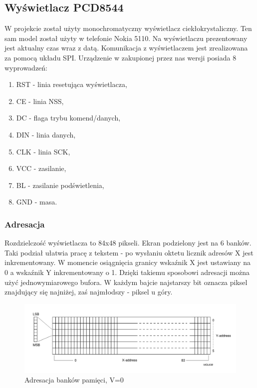 \documentclass{article}
\begin{document}
\subsection{Wyświetlacz PCD8544}

W projekcie został użyty monochromatyczny wyświetlacz ciekłokrystaliczny. Ten sam model
został użyty w telefonie Nokia 5110. Na wyświetlaczu prezentowany jest aktualny czas wraz z datą.
Komunikacja z wyświetlaczem jest zrealizowana za pomocą układu SPI.
Urządzenie w zakupionej przez nas wersji posiada 8 wyprowadzeń:

\begin{enumerate}
    \item RST - linia resetująca wyświetlacza,
    \item CE - linia NSS,
    \item DC - flaga trybu komend/danych,
    \item DIN - linia danych,
    \item CLK - linia SCK,
    \item VCC - zasilanie,
    \item BL - zasilanie podświetlenia,
    \item GND - masa.
\end{enumerate}

\subsubsection{Adresacja}
Rozdzielczość wyświetlacza to 84x48 pikseli. Ekran podzielony jest na 6 banków.
Taki podział ułatwia pracę z tekstem - po wysłaniu oktetu licznik adresów
X jest inkrementowany. W momencie osiągnięcia granicy wskaźnik X jest ustawiany na
0 a wskaźnik Y inkrementowany o 1. Dzięki takiemu sposobowi adresacji można użyć
jednowymiarowego bufora. W każdym bajcie najstarszy bit oznacza piksel znajdujący się najniżej,
zaś najmłodszy - piksel u góry.


\begin{figure}[ht]
    \includegraphics[scale=0.50]{address_display}
    \caption{Adresacja banków pamięci, V=0}
\end{figure}
\end{document}

